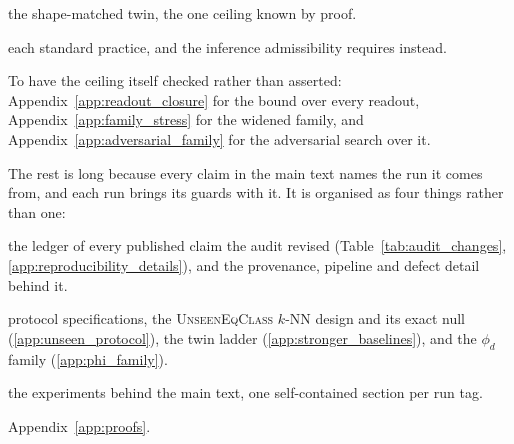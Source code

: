 \begin{description}[nosep, leftmargin=1.2em]
\item[\S\ref{sec:structural_scale}] the shape-matched twin, the one ceiling known by proof.
\item[\S\ref{sec:not_control_task}] each standard practice, and the inference admissibility requires instead.
\end{description}

\noindent To have the ceiling itself checked rather than asserted: Appendix~\ref{app:readout_closure} for the bound over every readout, Appendix~\ref{app:family_stress} for the widened family, and Appendix~\ref{app:adversarial_family} for the adversarial search over it.

The rest is long because every claim in the main text names the run it comes from, and each run brings its guards with it. It is organised as four things rather than one:

\begin{description}[nosep, leftmargin=1.2em]
\item[(i)~\textbf{A--K}] the ledger of every published claim the audit revised (Table~\ref{tab:audit_changes}, \ref{app:reproducibility_details}), and the provenance, pipeline and defect detail behind it.
\item[(ii)~\textbf{L--Z}] protocol specifications, the \textsc{UnseenEqClass} $k$-NN design and its exact null (\ref{app:unseen_protocol}), the twin ladder (\ref{app:stronger_baselines}), and the $\phi_d$ family (\ref{app:phi_family}).
\item[(iii)~\textbf{AA--BD}] the experiments behind the main text, one self-contained section per run tag.
\item[(iv)~\textbf{Proofs}] Appendix~\ref{app:proofs}.
\end{description}

